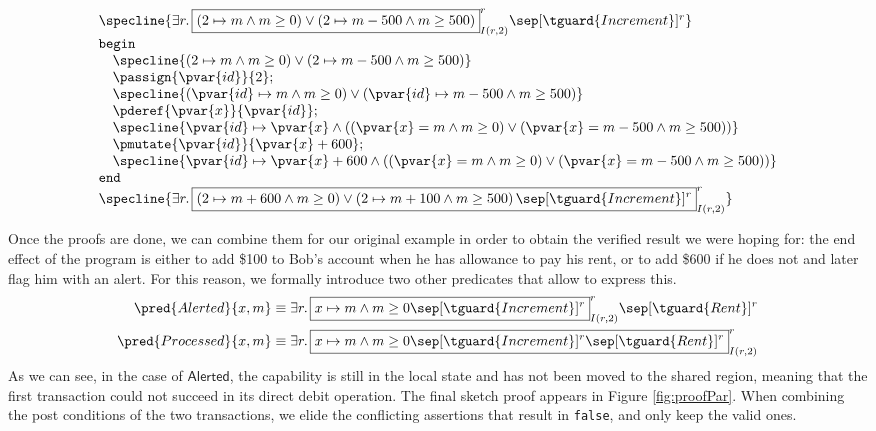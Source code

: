 \begin{center}
\[
	\begin{array}{l}
		\specline{
			\exists r \ldotp
				\boxed{
					\left( 2 \mapsto m \land m \geq 0 \right)
						\lor
					\left( 2 \mapsto m - 500 \land m \geq 500 \right) 
				}^r_{I(r, 2)}
				\sep [\tguard{Increment}]^r
		} \\
		\mathtt{begin} \\
			\quad \specline{
				\left( 2 \mapsto m \land m \geq 0 \right)
					\lor
				\left( 2 \mapsto m - 500 \land m \geq 500 \right) 
			} \\
			\quad \passign{\pvar{id}}{2}; \\
			\quad \specline{
				\left( \pvar{id} \mapsto m \land m \geq 0 \right)
					\lor
				\left( \pvar{id} \mapsto m - 500 \land m \geq 500 \right)
			} \\
			\quad \pderef{\pvar{x}}{\pvar{id}}; \\
			\quad \specline{
				\pvar{id} \mapsto \pvar{x}
					\land
				\left( \left( \pvar{x} = m \land m \geq 0 \right)
					\lor
				\left( \pvar{x} = m - 500 \land m \geq 500 \right) \right)
			} \\
			\quad \pmutate{\pvar{id}}{\pvar{x} + 600}; \\
			\quad \specline{
				\pvar{id} \mapsto \pvar{x} + 600
					\land
				\left( \left( \pvar{x} = m \land m \geq 0 \right)
					\lor
				\left( \pvar{x} = m - 500 \land m \geq 500 \right) \right)
			} \\
		\mathtt{end} \\
		\specline{
				\exists r \ldotp
					\boxed{
						\left( 2 \mapsto m + 600 \land m \geq 0 \right)
							\lor
						\left( 2 \mapsto m + 100 \land m \geq 500 \right)
						\sep [\tguard{Increment}]^r
					}^r_{I(r, 2)}
		}
	\end{array}
\]
\label{fig:proofR}
\end{center}
Once the proofs are done, we can combine them for our original example in order to obtain the verified result we were hoping for: the end effect of the program is either to add \$100 to Bob's account when he has allowance to pay his rent, or to add \$600 if he does not and later flag him with an alert. For this reason, we formally introduce two other predicates that allow to express this.
\begin{align*}
	\pred{Alerted}{x, m}
		&\equiv
	\exists r \ldotp
		\boxed{
			x \mapsto m \land m \geq 0
			\sep [\tguard{Increment}]^r
		}^r_{I(r, 2)}
		\sep [\tguard{Rent}]^r
	\\
	\pred{Processed}{x, m}
		&\equiv
	\exists r \ldotp
		\boxed{
			x \mapsto m \land m \geq 0
			\sep [\tguard{Increment}]^r
			\sep [\tguard{Rent}]^r
		}^r_{I(r, 2)}
\end{align*}
As we can see, in the case of $\mathsf{Alerted}$, the  capability is still in the local state and has not been moved to the shared region, meaning that the first transaction could not succeed in its direct debit operation. The final sketch proof appears in Figure \ref{fig:proofPar}. When combining the post conditions of the two transactions, we elide the conflicting assertions that result in \texttt{false}, and only keep the valid ones.

